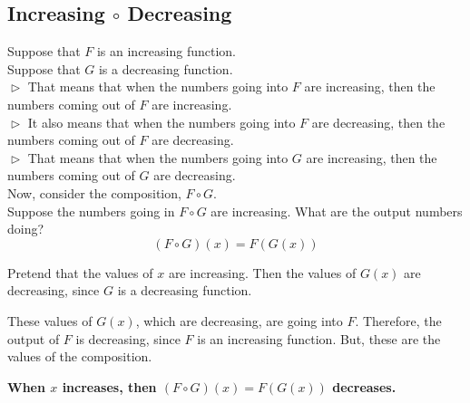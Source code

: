 \documentclass{ximera}
\begin{document}
\subsection*{Increasing $\circ$ Decreasing}


Suppose that $F$ is an increasing function. \\
Suppose that $G$ is a decreasing function. \\


$\vartriangleright$ That means that when the numbers going into $F$ are increasing, then the numbers coming out of $F$ are increasing. \\

$\vartriangleright$ It also means that when the numbers going into $F$ are decreasing, then the numbers coming out of $F$ are decreasing. \\



$\vartriangleright$ That means that when the numbers going into $G$ are increasing, then the numbers coming out of $G$ are decreasing. \\



Now, consider the composition, $F \circ G$. \\


Suppose the numbers going in $F \circ G$ are increasing.  What are the output numbers doing? \\




\[ (F \circ G)(x) = F(G(x)) \]


Pretend that the values of $x$ are increasing. Then the values of $G(x)$ are decreasing, since $G$ is a decreasing function.

These values of $G(x)$, which are decreasing, are going into $F$.  Therefore, the output of $F$ is decreasing, since $F$ is an increasing function.  But, these are the values of the composition.


\begin{center}
\textbf{\textcolor{red!70!black}{When $x$ increases, then $(F \circ G)(x) = F(G(x))$ decreases.}}
\end{center}
\end{document}
